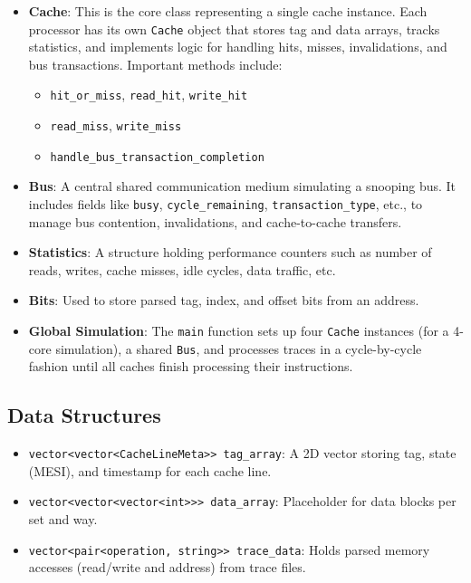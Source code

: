 \documentclass{article}
\begin{document}
\begin{itemize}
    \item \textbf{Cache}: This is the core class representing a single cache instance. Each processor has its own \texttt{Cache} object that stores tag and data arrays, tracks statistics, and implements logic for handling hits, misses, invalidations, and bus transactions. Important methods include:
    \begin{itemize}
        \item \texttt{hit\_or\_miss}, \texttt{read\_hit}, \texttt{write\_hit}
        \item \texttt{read\_miss}, \texttt{write\_miss}
        \item \texttt{handle\_bus\_transaction\_completion}
    \end{itemize}

    \item \textbf{Bus}: A central shared communication medium simulating a snooping bus. It includes fields like \texttt{busy}, \texttt{cycle\_remaining}, \texttt{transaction\_type}, etc., to manage bus contention, invalidations, and cache-to-cache transfers.

    \item \textbf{Statistics}: A structure holding performance counters such as number of reads, writes, cache misses, idle cycles, data traffic, etc.

    \item \textbf{Bits}: Used to store parsed tag, index, and offset bits from an address.

    \item \textbf{Global Simulation}: The \texttt{main} function sets up four \texttt{Cache} instances (for a 4-core simulation), a shared \texttt{Bus}, and processes traces in a cycle-by-cycle fashion until all caches finish processing their instructions.
\end{itemize}

\subsection{Data Structures}

\begin{itemize}
    \item \texttt{vector<vector<CacheLineMeta>> tag\_array}: A 2D vector storing tag, state (MESI), and timestamp for each cache line.
    \item \texttt{vector<vector<vector<int>>> data\_array}: Placeholder for data blocks per set and way.
    \item \texttt{vector<pair<operation, string>> trace\_data}: Holds parsed memory accesses (read/write and address) from trace files.
\end{itemize}
\end{document}
